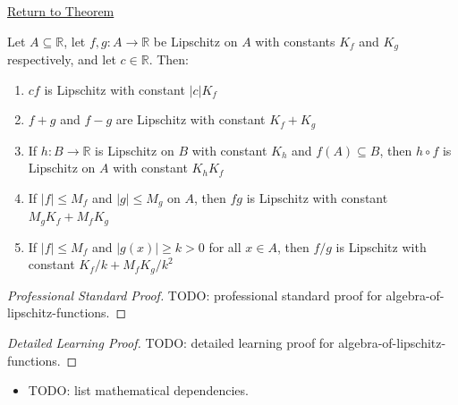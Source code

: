 \newpage
{}
\label{prf:algebra-of-lipschitz-functions}

\begin{remark*}[Return]
\hyperref[thm:algebra-of-lipschitz-functions]{Return to Theorem}
\end{remark*}

\begin{theorem*}
Let $A \subseteq \mathbb{R}$, let $f, g : A \to \mathbb{R}$ be Lipschitz on $A$ with constants $K_f$ and $K_g$ respectively, and let $c \in \mathbb{R}$. Then:
\begin{enumerate}
\item[(a)] $cf$ is Lipschitz with constant $|c|K_f$
\item[(b)] $f + g$ and $f - g$ are Lipschitz with constant $K_f + K_g$
\item[(c)] If $h : B \to \mathbb{R}$ is Lipschitz on $B$ with constant $K_h$ and $f(A) \subseteq B$, then $h \circ f$ is Lipschitz on $A$ with constant $K_h K_f$
\item[(d)] If $|f| \leq M_f$ and $|g| \leq M_g$ on $A$, then $fg$ is Lipschitz with constant $M_g K_f + M_f K_g$
\item[(e)] If $|f| \leq M_f$ and $|g(x)| \geq k > 0$ for all $x \in A$, then $f/g$ is Lipschitz with constant $K_f/k + M_f K_g/k^2$
\end{enumerate}
\end{theorem*}

\begin{proof}[Professional Standard Proof]
\LRAProofBodyStart
TODO: professional standard proof for algebra-of-lipschitz-functions.
\end{proof}

\begin{proof}[Detailed Learning Proof]
\LRAProofBodyStart
TODO: detailed learning proof for algebra-of-lipschitz-functions.
\end{proof}

\begin{remark*}
\end{remark*}

\begin{dependencies}
\begin{itemize}
  \item TODO: list mathematical dependencies.
\end{itemize}
\end{dependencies}

\clearpage
